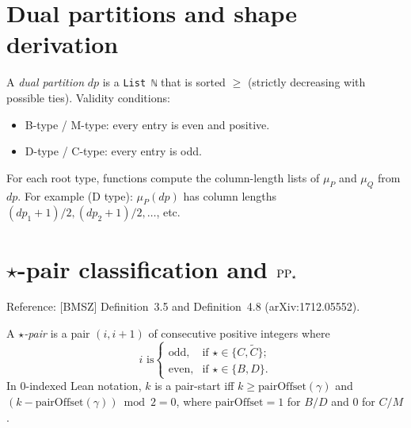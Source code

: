 \section{Dual partitions and shape derivation}

\begin{definition}
  \label{def:DualPart}
  \leanok
  A \emph{dual partition} $dp$ is a \texttt{List ℕ} that is sorted $\geq$ (strictly decreasing with possible ties). Validity conditions:
  \begin{itemize}
    \item B-type / M-type: every entry is even and positive.
    \item D-type / C-type: every entry is odd.
  \end{itemize}
\end{definition}

\begin{definition}
  \label{def:dpartColLens}
  \leanok
  For each root type, functions compute the column-length lists of $\mu_P$ and $\mu_Q$ from $dp$. For example (D type): $\mu_P(dp)$ has column lengths $(dp_1 + 1)/2, (dp_2 + 1)/2, \ldots$, etc.
\end{definition}

\section{\texorpdfstring{$\star$-pair classification}{star-pair classification} and \texorpdfstring{$\mathrm{PP}_\star$}{PP}}

Reference: [BMSZ] Definition~3.5 and Definition~4.8 (arXiv:1712.05552).

\begin{definition}
  \label{def:star_pair}
  \leanok
  A \emph{$\star$-pair} is a pair $(i, i+1)$ of consecutive positive integers where
  \[
    i \text{ is}
      \begin{cases}
        \text{odd}, & \text{if } \star \in \{C, \tilde{C}\}; \\
        \text{even}, & \text{if } \star \in \{B, D\}.
      \end{cases}
  \]
  In 0-indexed Lean notation, $k$ is a pair-start iff $k \geq \mathrm{pairOffset}(\gamma)$ and $(k - \mathrm{pairOffset}(\gamma)) \bmod 2 = 0$, where $\mathrm{pairOffset} = 1$ for $B/D$ and $0$ for $C/M$.
\end{definition}

